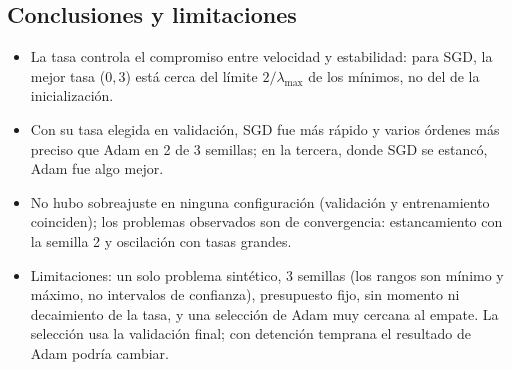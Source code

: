 \documentclass[10pt]{article}
\begin{document}
\subsection{Conclusiones y limitaciones}
\begin{itemize}[nosep]
  \item La tasa controla el compromiso entre velocidad y estabilidad: para SGD, la mejor tasa ($0{,}3$)
        está cerca del límite $2/\lambda_{\max}$ de los mínimos, no del de la inicialización.
  \item Con su tasa elegida en validación, SGD fue más rápido y varios órdenes más preciso que Adam
        en 2 de 3 semillas; en la tercera, donde SGD se estancó, Adam fue algo mejor.
  \item No hubo sobreajuste en ninguna configuración (validación y entrenamiento coinciden); los
        problemas observados son de convergencia: estancamiento con la semilla 2 y oscilación con
        tasas grandes.
  \item Limitaciones: un solo problema sintético, 3 semillas (los rangos son mínimo y máximo, no
        intervalos de confianza), presupuesto fijo, sin momento ni decaimiento de la tasa, y una
        selección de Adam muy cercana al empate. La selección usa la validación final; con
        detención temprana el resultado de Adam podría cambiar.
\end{itemize}

\end{document}
